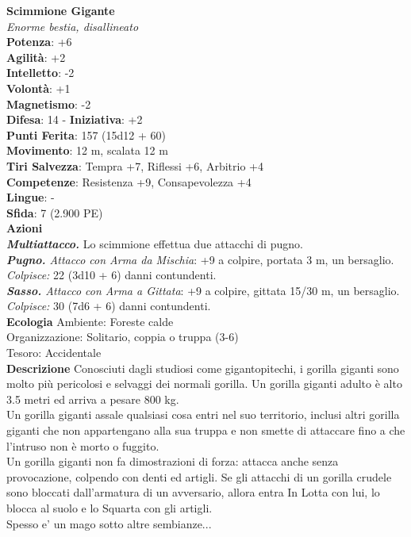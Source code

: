 \begin{multicols}{2}
\medskip\textbf{Scimmione Gigante}\\
\emph{Enorme bestia, disallineato}\\
\textbf{Potenza}: +6\\
\textbf{Agilità}: +2\\
\textbf{Intelletto}: -2\\
\textbf{Volontà}: +1\\
\textbf{Magnetismo}: -2\\
\textbf{Difesa}: 14 - \textbf{Iniziativa}: +2\\
\textbf{Punti Ferita}: 157 (15d12 + 60)\\
\textbf{Movimento}: 12 m, scalata 12 m\\
\textbf{Tiri Salvezza}: Tempra +7, Riflessi +6, Arbitrio +4\\
\textbf{Competenze}: Resistenza +9, Consapevolezza +4\\
\textbf{Lingue}: -\\
\textbf{Sfida}: 7 (2.900 PE)\smallskip\\
\smallskip\textbf{Azioni}\\
\emph{\textbf{Multiattacco.}} Lo scimmione effettua due attacchi di pugno.\\
\emph{\textbf{Pugno.} Attacco con Arma da Mischia}: +9 a colpire, portata 3 m, un bersaglio.\\
\emph{Colpisce:} 22 (3d10 + 6) danni contundenti. \\
\emph{\textbf{Sasso.} Attacco con Arma a Gittata}: +9 a colpire, gittata 15/30 m, un bersaglio.\\
\emph{Colpisce:} 30 (7d6 + 6) danni contundenti.\\
\textbf{Ecologia}
Ambiente: Foreste calde\\
Organizzazione: Solitario, coppia o truppa (3-6)\\
Tesoro: Accidentale\\
\textbf{Descrizione}
Conosciuti dagli studiosi come gigantopitechi, i gorilla giganti sono molto più pericolosi e selvaggi dei normali gorilla. Un gorilla giganti adulto è alto 3.5 metri ed arriva a pesare 800 kg.\\
Un gorilla giganti assale qualsiasi cosa entri nel suo territorio, inclusi altri gorilla giganti che non appartengano alla sua truppa e non smette di attaccare fino a che l’intruso non è morto o fuggito.\\
Un gorilla giganti non fa dimostrazioni di forza: attacca anche senza provocazione, colpendo con denti ed artigli. Se gli attacchi di un gorilla crudele sono bloccati dall’armatura di un avversario, allora entra In Lotta con lui, lo blocca al suolo e lo Squarta con gli artigli.\\
Spesso e' un mago sotto altre sembianze...\\



\end{multicols}
